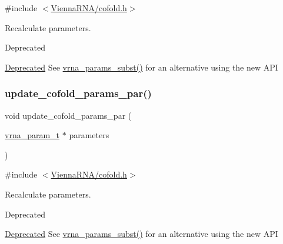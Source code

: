 {\ttfamily \#include $<$\hyperlink{cofold_8h}{Vienna\+R\+N\+A/cofold.\+h}$>$}



Recalculate parameters. 

\begin{DoxyRefDesc}{Deprecated}
\item[\hyperlink{deprecated__deprecated000033}{Deprecated}]See \hyperlink{group__energy__parameters_ga5d1909208f7ea3baa98b75afaa1f62ca}{vrna\+\_\+params\+\_\+subst()} for an alternative using the new A\+PI\end{DoxyRefDesc}
\mbox{\label{group__mfe__global__deprecated_gaaadbd28b4e428710529ab4098fdacad3}} 
\subsubsection{\texorpdfstring{update\+\_\+cofold\+\_\+params\+\_\+par()}{update\_cofold\_params\_par()}}
{\footnotesize\ttfamily void update\+\_\+cofold\+\_\+params\+\_\+par (\begin{DoxyParamCaption}\item[{\hyperlink{group__energy__parameters_ga8a69ca7d787e4fd6079914f5343a1f35}{vrna\+\_\+param\+\_\+t} $\ast$}]{parameters }\end{DoxyParamCaption})}



{\ttfamily \#include $<$\hyperlink{cofold_8h}{Vienna\+R\+N\+A/cofold.\+h}$>$}



Recalculate parameters. 

\begin{DoxyRefDesc}{Deprecated}
\item[\hyperlink{deprecated__deprecated000034}{Deprecated}]See \hyperlink{group__energy__parameters_ga5d1909208f7ea3baa98b75afaa1f62ca}{vrna\+\_\+params\+\_\+subst()} for an alternative using the new A\+PI\end{DoxyRefDesc}
\mbox{\label{group__mfe__global__deprecated_ga5f5bf4df35d0554f6ace9579f8744c48}} 
